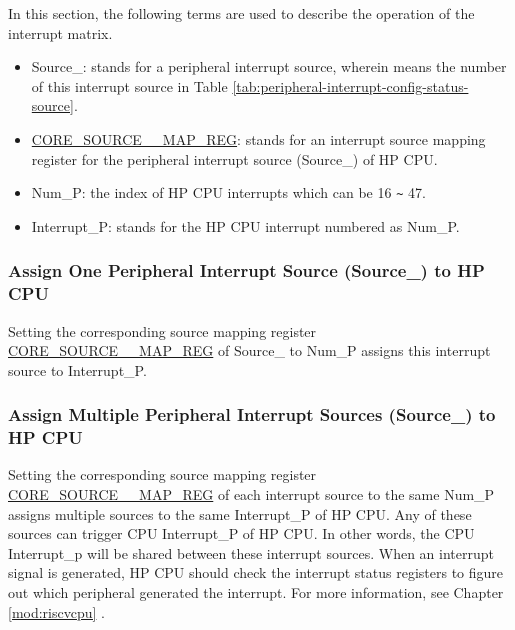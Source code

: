 \documentclass[main\_\_EN.tex]{subfiles}
\begin{document}
In this section, the following terms are used to describe the operation of the interrupt matrix.

\begin{itemize}

\item Source\_: stands for a peripheral interrupt source, wherein  means the number of this interrupt source in Table \ref{tab:peripheral-interrupt-config-status-source}.
\item \hyperref[regdesc:CORE0SOURCEregindexYMAPREG]{CORE\_SOURCE\_\_MAP\_REG}: stands for an interrupt source mapping register for the peripheral interrupt source (Source\_) of HP CPU.
\item Num\_P: the index of HP CPU interrupts which can be 16 \verb+~+ 47.
\item Interrupt\_P: stands for the HP CPU interrupt numbered as Num\_P.

\end{itemize}

\subsubsection{Assign One Peripheral Interrupt Source (Source\_) to HP CPU}

Setting the corresponding source mapping  register \hyperref[regdesc:CORE0SOURCEregindexYMAPREG]{CORE\_SOURCE\_\_MAP\_REG} of Source\_ to Num\_P assigns this interrupt source to Interrupt\_P.

\subsubsection{Assign Multiple Peripheral Interrupt Sources (Source\_) to HP CPU}

Setting the corresponding source mapping register \hyperref[regdesc:CORE0SOURCEregindexYMAPREG]{CORE\_SOURCE\_\_MAP\_REG} of each interrupt source to the same Num\_P assigns multiple sources to the same Interrupt\_P of HP CPU. Any of these sources can trigger CPU Interrupt\_P of HP CPU. In other words, the CPU Interrupt\_p will be shared between these interrupt sources. When an interrupt signal is generated, HP CPU should check the interrupt status registers to figure out which peripheral generated the interrupt. For more information, see Chapter \ref{mod:riscvcpu} \textit{}.
\end{document}
